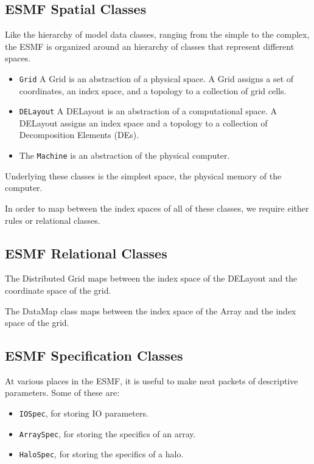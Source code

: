 \subsection{ESMF Spatial Classes}

Like the hierarchy of model data classes, ranging from the 
simple to the complex, the ESMF is organized around an hierarchy of 
classes that represent different spaces.

\begin{itemize}
\item {\tt Grid}  A Grid is an abstraction of a physical space.  
A Grid assigns a set of coordinates, an index space, and a topology 
to a collection of grid cells. 
\item {\tt DELayout}  A DELayout is an abstraction of a computational 
space.  A DELayout assigns an index space and a topology to a 
collection of Decomposition Elements (DEs).
\item The {\tt Machine} is an abstraction of the physical computer.  
\end{itemize} 

Underlying these classes is the simplest space, the physical memory of 
the computer.  

In order to map between the index spaces of all of these classes,
we require either rules or relational classes.

\subsection{ESMF Relational Classes}

The Distributed Grid maps between the index space of the DELayout
and the coordinate space of the grid.

The DataMap class maps between the index space of the Array and
the index space of the grid.

\subsection{ESMF Specification Classes}

At various places in the ESMF, it is useful to make neat packets
of descriptive parameters.  Some of these are:
\begin{itemize}
\item {\tt IOSpec}, for storing IO parameters.
\item {\tt ArraySpec}, for storing the specifics of an array.
\item {\tt HaloSpec}, for storing the specifics of a halo.
\end{itemize}

